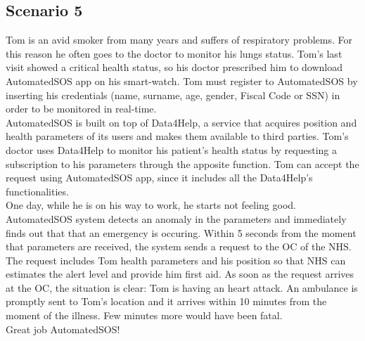     \subsection{Scenario 5}
    Tom is an avid smoker from many years and suffers of respiratory problems. For this reason he often goes to the doctor to monitor his lungs status.
    Tom's last visit showed a critical health status, so his doctor prescribed him to download AutomatedSOS app on his smart-watch.
    Tom must register to AutomatedSOS by inserting his credentials (name, surname, age, gender, Fiscal Code or SSN) in order to be monitored in real-time. \\
    AutomatedSOS is built on top of Data4Help, a service that acquires position and health parameters of its users and makes them available to third parties.
    Tom's doctor uses Data4Help to monitor his patient's health status by requesting a subscription to his parameters through the apposite function.
    Tom can accept the request using AutomatedSOS app, since it includes all the Data4Help's functionalities. \\
    One day, while he is on his way to work, he starts not feeling good. AutomatedSOS system detects an anomaly in the parameters and immediately finds out that that an emergency is occuring. 
    Within 5 seconds from the moment that parameters are received, the system sends a request to the OC of the NHS. \\
    The request includes Tom health parameters and his position so that NHS can estimates the alert level and provide him first aid.
    As soon as the request arrives at the OC, the situation is clear: Tom is having an heart attack. An ambulance is promptly sent to Tom's location and it arrives within 10 minutes from the moment of the illness.
    Few minutes more would have been fatal. \\
    Great job AutomatedSOS!
    
